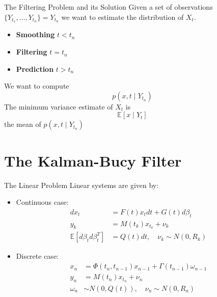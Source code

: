 \documentclass{beamer}
\begin{document}
\begin{frame}{The Filtering Problem and its Solution}
  Given a set of observations $\{Y_{t_1},\dots,Y_{t_n}\} = Y_{t_n}$ we want to
  estimate the distribution of $X_t$.

  \pause
  \begin{itemize}
    \pause
  \item \textbf{Smoothing} $t < t_n$ \pause
  \item \textbf{Filtering} $t = t_n$ \pause
  \item \textbf{Prediction} $t > t_n$
  \end{itemize}

  \pause We want to compute
  \begin{equation}
    p(x,t \mid Y_{t_n})
  \end{equation}
  \pause The minimum variance estimate of $X_t$ is
  \begin{equation}
    \mathbb{E}[x \mid Y_t]
  \end{equation}
  the mean of $p(x,t \mid Y_{t_n})$
\end{frame}

\section{The Kalman-Bucy Filter}

\begin{frame}{The Linear Problem}
  Linear systems are given by:

  \begin{itemize}
   \pause
  \item Continuous case: \\
    \begin{align}
      dx_t &= F(t) x_t dt + G(t) d\beta_t \\
      y_k &= M(t_k) x_{t_k} + \nu_k \\
      \mathbb{E}[d\beta_td\beta_t^T] &= Q(t) dt, \quad \nu_k \sim N(0,R_k)
    \end{align}
   \pause
  \item Discrete case: \\
    \begin{align}
      x_n &= \Phi(t_n,t_{n-1})x_{n-1} + \Gamma(t_{n-1})\omega_{n-1}  \\
      y_n &= M(t_n) x_{t_n} + \nu_n \\
      \omega_{n} &\sim N(0,Q(t)), \quad \nu_n \sim N(0,R_n)
    \end{align}
  \end{itemize}
\end{frame}
\end{document}
